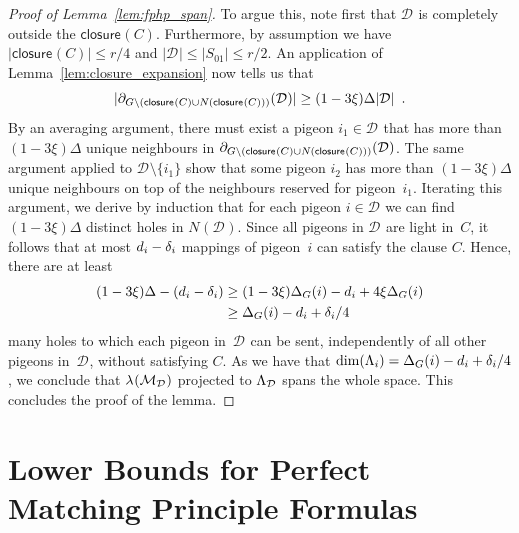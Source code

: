 \documentclass{theoretics}
\providecommand{\abs}[1]{\lvert#1\rvert}
\newcommand{\boundary}[1]{\ensuremath{\partial #1}}
\newcommand{\set}[1]{\{ #1 \}}
\newcommand{\setsize}[1]{\lvert#1\rvert}
\newcommand{\eqperiod}{\enspace .}
\newcommand{\reflem}[1]{Lemma~\ref{#1}}
\newcommand{\light}{light\xspace}
\newcommand{\neigh}[2][]{N_{{#1}}(#2)}
\newcommand{\uniqueNeigh}[2][]{\boundary_{{#1}} ({#2})}
\renewcommand{\deg}[2][XXXXXXXXXXXX]{\Delta_{#1}(#2)}
\newcommand{\diff}{\xi}
\newcommand{\dimLi}{\deg[G]{i} - d_i + \delta_i/4}
\newcommand{\GdegMax}{\Delta}
\newcommand{\thr}[1]{ \ensuremath d_{{#1}} }
\newcommand{\adv}[1]{\delta_{{#1}}}
\newcommand{\linspace}[1][]{\ensuremath \Lambda_{{#1}}}
\newcommand{\linmap}[1][]{\ensuremath \lambda_{{#1}}}
\newcommand{\linmapof}[2][]{\linmap[#1](#2)}
\newcommand{\closure}[2][]{\mathsf{closure}_{{#1}}(#2)}
\newcommand{\diffclosure}[1][]{D_{{#1}}}
\renewcommand{\diffclosure}[1][]{\mathcal{D}_{{#1}}}
\newcommand{\matchings}[1][]{\ensuremath \mathcal{M}_{{#1}}}
\numberwithin{equation}{section}
\begin{document}
\begin{proof}[Proof of \reflem{lem:fphp_span}]
  
  To argue this, note first
  that $\diffclosure$ is completely outside the $\closure{C}$.
  Furthermore,
  by assumption we have
  $\setsize{\closure{C}} \leq  r/4$ and  
  $
  \setsize{ \diffclosure } 
  \leq
  \setsize{ S_{01} } 
  \leq 
  r/2
  $. 
  An application of
  \reflem{lem:closure_expansion} 
  now tells us that
  \begin{equation}
    \abs{ \uniqueNeigh[G \setminus (\closure{C} \cup \neigh{\closure{C}})]
      {\diffclosure} } \ge 
    (1 - 3 \diff) \GdegMax \setsize{\diffclosure} 
    \eqperiod
  \end{equation}    
  By an averaging argument,
  there must exist a pigeon $i_1 \in \diffclosure$
  that has more than $(1 - 3 \diff) \GdegMax$ 
  unique neighbours in 
  $\uniqueNeigh[G \setminus 
  (\closure{C} \cup \neigh{\closure{C}})]{\diffclosure}$.
  The same argument applied to   
  $\diffclosure \setminus \set{ i_1 }$
  show that some pigeon $i_2$
  has more than $(1 - 3 \diff) \GdegMax$ 
  unique neighbours on top of the neighbours reserved for
  pigeon~$i_1$.
  Iterating this argument, 
  we derive by induction that for each pigeon 
  $i \in \diffclosure$  we can find
  $(1 - 3 \diff) \GdegMax$ distinct holes
  in $\neigh{\diffclosure}$.
  Since all pigeons in  $\diffclosure$ are \light in~$C$, 
  it follows that at most $\thr{i} - \adv{i}$ mappings of pigeon~$i$
  can satisfy the clause $C$. Hence, there are at least
  \begin{align}
    (1 - 3 \diff) \GdegMax - (\thr{i} - \adv{i})
    &\geq 
      (1 - 3 \diff) \deg[G]{i} - \thr{i} + 4 \diff \deg[G]{i}
      \nonumber \\
    &\geq
      \deg[G]{i} - \thr{i} + \adv{i}/4
  \end{align}
  many holes to which  each pigeon in~$\diffclosure$
  can be sent, independently of all other pigeons in~$\diffclosure$,
  without satisfying $C$. As we 
  have that
  $\dim(\linspace[i]) = \dimLi$, we conclude that
  $\linmapof{\matchings[\diffclosure]}$ projected to
  $\linspace[\diffclosure]$ spans the whole space.
  This concludes the proof of the lemma.
\end{proof}


 

\newcommand{\closureconstant}{20}
\newcommand{\closureconplus}{28}

\section{Lower Bounds for 
  Perfect Matching Principle
    Formulas}
\label{sec:pm}
\end{document}
